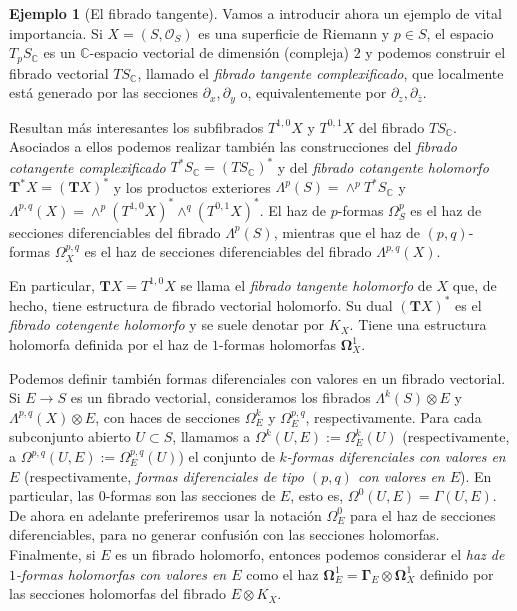 \documentclass[12pt,a4paper]{article}
\theoremstyle{definition} \newtheorem{defn}[thm]{Definición}
\theoremstyle{definition} \newtheorem{ejemplo}[thm]{Ejemplo}
\theoremstyle{definition} \newtheorem{ejercicio}[thm]{Ejercicio}
\def\CC{\mathbb{C}}
\def\OO{\mathscr{O}}
\begin{document}
	      \begin{ejemplo} [El fibrado tangente]
		Vamos a introducir ahora un ejemplo de vital importancia. Si $X=(S,\OO_S)$ es una superficie de Riemann y $p\in S$, el espacio $T_pS_{\CC}$ es un $\CC$-espacio vectorial de dimensión (compleja) $2$ y podemos construir el fibrado vectorial $TS_{\CC}$, llamado el \emph{fibrado tangente complexificado}, que localmente está generado por las secciones $\partial_x, \partial_y$ o, equivalentemente por $\partial_z, \partial_{\bar{z}}$. 
		
		Resultan más interesantes los subfibrados $T^{1,0}X$ y $T^{0,1}X$ del fibrado $TS_{\CC}$. Asociados a ellos podemos realizar también las construcciones del \emph{fibrado cotangente complexificado} $T^*S_{\CC}=(TS_{\CC})^*$ y del \emph{fibrado cotangente holomorfo} $\boldsymbol{T}^* X = (\boldsymbol{T}X)^*$ y los productos exteriores $\Lambda^p(S)=\wedge^p T^*S_{\CC}$ y $\Lambda^{p,q}(X)=\wedge^p (T^{1,0}X)^* \wedge^q (T^{0,1}X)^*$. El haz de $p$-formas $\Omega^p_S$ es el haz de secciones diferenciables del fibrado $\Lambda^p(S)$, mientras que el haz de $(p,q)$-formas $\Omega^{p,q}_X$ es el haz de secciones diferenciables del fibrado $\Lambda^{p,q}(X)$.

		En particular, $\boldsymbol{T}X=T^{1,0}X$ se llama el \emph{fibrado tangente holomorfo} de $X$ que, de hecho, tiene estructura de fibrado vectorial holomorfo. Su dual $(\boldsymbol{T}X)^*$ es el \emph{fibrado cotengente holomorfo} y se suele denotar por $K_X$. Tiene una estructura holomorfa definida por el haz de $1$-formas holomorfas $\boldsymbol{\Omega}^1_X$.

		Podemos definir también formas diferenciales con valores en un fibrado vectorial. Si $E\rightarrow S$ es un fibrado vectorial, consideramos los fibrados $\Lambda^k(S) \otimes E$ y $\Lambda^{p,q}(X)\otimes E$, con haces de secciones $\Omega^k_E$ y $\Omega^{p,q}_E$, respectivamente. Para cada subconjunto abierto $U\subset S$, llamamos a $\Omega^k(U,E):=\Omega^k_E(U)$ (respectivamente, a $\Omega^{p,q}(U,E):=\Omega^{p,q}_E(U)$) el conjunto de \emph{$k$-formas diferenciales con valores en $E$} (respectivamente, \emph{formas diferenciales de tipo $(p,q)$ con valores en $E$}). En particular, las $0$-formas son las secciones de $E$, esto es, $\Omega^0(U,E)=\Gamma(U,E)$. De ahora en adelante preferiremos usar la notación $\Omega^0_E$ para el haz de secciones diferenciables, para no generar confusión con las secciones holomorfas. Finalmente, si $E$ es un fibrado holomorfo, entonces podemos considerar el \emph{haz de $1$-formas holomorfas con valores en $E$} como el haz $\boldsymbol{\Omega}^1_E=\boldsymbol{\Gamma}_E \otimes \boldsymbol{\Omega}^1_X$ definido por las secciones holomorfas del fibrado $E\otimes K_X$.
	      \end{ejemplo}
\end{document}
